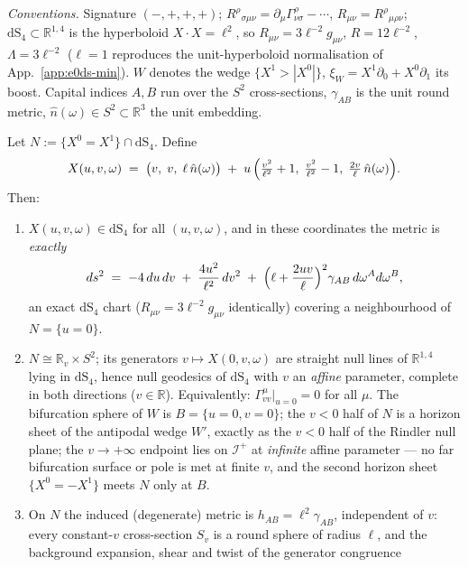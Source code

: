\emph{Conventions.} Signature $({-},{+},{+},{+})$;
$R^{\rho}{}_{\sigma\mu\nu}
=\partial_{\mu}\Gamma^{\rho}_{\nu\sigma}-\cdots$,
$R_{\mu\nu}=R^{\rho}{}_{\mu\rho\nu}$; $\mathrm{dS}_{4}\subset
\mathbb{R}^{1,4}$ is the hyperboloid $X\cdot X=\ell^{2}$, so
$R_{\mu\nu}=3\ell^{-2}g_{\mu\nu}$, $R=12\ell^{-2}$,
$\Lambda=3\ell^{-2}$ ($\ell=1$ reproduces the unit-hyperboloid
normalisation of App.~\ref{app:e0ds-min}). $W$ denotes the wedge
$\{X^{1}>|X^{0}|\}$, $\xi_{W}=X^{1}\partial_{0}+X^{0}\partial_{1}$ its
boost. Capital indices $A,B$ run over the $S^{2}$ cross-sections,
$\gamma_{AB}$ is the unit round metric, $\hat n(\omega)\in S^{2}
\subset\mathbb{R}^{3}$ the unit embedding.

\begin{lemma}
\label{lem:pair-chart}
Let $N:=\{X^{0}=X^{1}\}\cap\mathrm{dS}_{4}$. Define
\[
X(u,v,\omega)\;=\;\bigl(v,\;v,\;\ell\,\hat n(\omega)\bigr)
\;+\;u\,\Bigl(\tfrac{v^{2}}{\ell^{2}}+1,\;\tfrac{v^{2}}{\ell^{2}}-1,\;
\tfrac{2v}{\ell}\,\hat n(\omega)\Bigr).
\]
Then:
\begin{enumerate}
\item[(i)] $X(u,v,\omega)\in\mathrm{dS}_{4}$ for all $(u,v,\omega)$,
and in these coordinates the metric is \emph{exactly}
\[
ds^{2}\;=\;-4\,du\,dv\;+\;\frac{4u^{2}}{\ell^{2}}\,dv^{2}
\;+\;\Bigl(\ell+\frac{2uv}{\ell}\Bigr)^{2}\gamma_{AB}\,
d\omega^{A}d\omega^{B},
\]
an exact $\mathrm{dS}_{4}$ chart ($R_{\mu\nu}=3\ell^{-2}g_{\mu\nu}$
identically) covering a neighbourhood of $N=\{u=0\}$.
\item[(ii)] $N\cong\mathbb{R}_{v}\times S^{2}$; its generators
$v\mapsto X(0,v,\omega)$ are straight null lines of $\mathbb{R}^{1,4}$
lying in $\mathrm{dS}_{4}$, hence null geodesics of $\mathrm{dS}_{4}$
with $v$ an \emph{affine} parameter, complete in both directions
($v\in\mathbb{R}$). Equivalently: $\Gamma^{\mu}_{vv}|_{u=0}=0$ for all
$\mu$. The bifurcation sphere of $W$ is $B=\{u=0,v=0\}$; the $v<0$
half of $N$ is a horizon sheet of the antipodal wedge $W'$, exactly as
the $v<0$ half of the Rindler null plane; the $v\to+\infty$ endpoint
lies on $\mathscr{I}^{+}$ at \emph{infinite} affine parameter --- no
far bifurcation surface or pole is met at finite $v$, and the second
horizon sheet $\{X^{0}=-X^{1}\}$ meets $N$ only at $B$.
\item[(iii)] On $N$ the induced (degenerate) metric is
$h_{AB}=\ell^{2}\gamma_{AB}$, independent of $v$: every constant-$v$
cross-section $S_{v}$ is a round sphere of radius $\ell$, and the
background expansion, shear and twist of the generator congruence

\end{enumerate}
\end{lemma}
